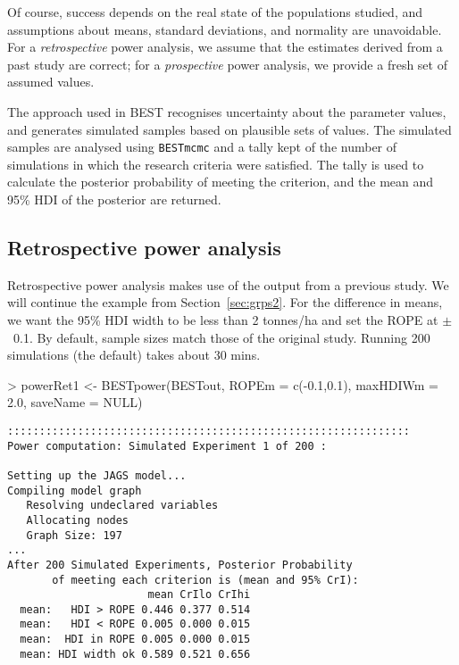 \documentclass[a4paper]{article}
\begin{document}
Of course, success depends on the real state of the populations studied, and assumptions about means, standard deviations, and normality are unavoidable. For a \emph{retrospective} power analysis, we assume that the estimates derived from a past study are correct; for a \emph{prospective} power analysis, we provide a fresh set of assumed values.

The approach used in BEST recognises uncertainty about the parameter values, and generates simulated samples based on plausible sets of values. The simulated samples are analysed using \texttt{BESTmcmc} and a tally kept of the number of simulations in which the research criteria were satisfied. The tally is used to calculate the posterior probability of meeting the criterion, and the mean and 95\% HDI of the posterior are returned.

\subsection{Retrospective power analysis}
\label{subsec:retroPower}

Retrospective power analysis makes use of the output from a previous study. We will continue the example from Section~\ref{sec:grps2}. For the difference in means, we want the 95\% HDI width to be less than 2 tonnes/ha and set the ROPE at $\pm$~0.1. By default, sample sizes match those of the original study. Running 200 simulations (the default) takes about 30 mins.

\begin{Schunk}
\begin{Sinput}
> powerRet1 <- BESTpower(BESTout, ROPEm = c(-0.1,0.1), maxHDIWm = 2.0, 
               saveName = NULL) 
\end{Sinput}
\end{Schunk}
\begin{verbatim}
:::::::::::::::::::::::::::::::::::::::::::::::::::::::::::::::
Power computation: Simulated Experiment 1 of 200 :

Setting up the JAGS model...
Compiling model graph
   Resolving undeclared variables
   Allocating nodes
   Graph Size: 197
...
After 200 Simulated Experiments, Posterior Probability
       of meeting each criterion is (mean and 95% CrI):
                      mean CrIlo CrIhi
  mean:   HDI > ROPE 0.446 0.377 0.514
  mean:   HDI < ROPE 0.005 0.000 0.015
  mean:  HDI in ROPE 0.005 0.000 0.015
  mean: HDI width ok 0.589 0.521 0.656
\end{verbatim}
\end{document}
